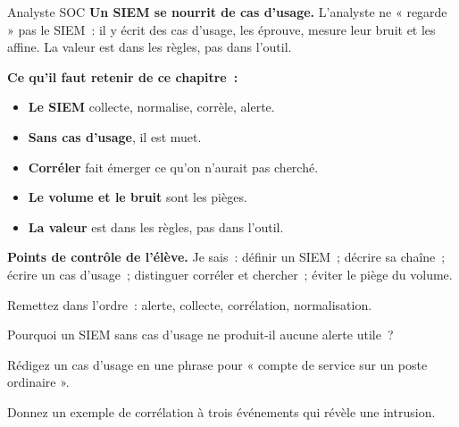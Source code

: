 \begin{boxmetier}{Analyste SOC}
\textbf{Un SIEM se nourrit de cas d'usage.} L'analyste ne « regarde » pas le
SIEM~: il y écrit des cas d'usage, les éprouve, mesure leur bruit et les
affine. La valeur est dans les règles, pas dans l'outil.
\end{boxmetier}

\separateur

\begin{boxresume}
\textbf{Ce qu'il faut retenir de ce chapitre~:}
\begin{itemize}
    \item \textbf{Le SIEM} collecte, normalise, corrèle, alerte.
    \item \textbf{Sans cas d'usage}, il est muet.
    \item \textbf{Corréler} fait émerger ce qu'on n'aurait pas cherché.
    \item \textbf{Le volume et le bruit} sont les pièges.
    \item \textbf{La valeur} est dans les règles, pas dans l'outil.
\end{itemize}
\end{boxresume}

\begin{boxinfo}
\textbf{Points de contrôle de l'élève.} Je sais~: définir un SIEM~; décrire
sa chaîne~; écrire un cas d'usage~; distinguer corréler et chercher~; éviter
le piège du volume.
\end{boxinfo}

\bigskip

\begin{boxexo}[title={\ding{45}\quad Exercice~5.1. Chaîne \niveaubase}]
Remettez dans l'ordre~: alerte, collecte, corrélation, normalisation.
\end{boxexo}

\begin{boxexo}[title={\ding{45}\quad Exercice~5.2. Muet \niveaubase}]
Pourquoi un SIEM sans cas d'usage ne produit-il aucune alerte utile~?
\end{boxexo}

\begin{boxexo}[title={\ding{45}\quad Exercice~5.3. Cas d'usage \niveaubase}]
Rédigez un cas d'usage en une phrase pour « compte de service sur un poste
ordinaire ».
\end{boxexo}

\begin{boxexo}[title={\ding{45}\quad Exercice~5.4. Corréler \niveaumoyen}]
Donnez un exemple de corrélation à trois événements qui révèle une intrusion.
\end{boxexo}

